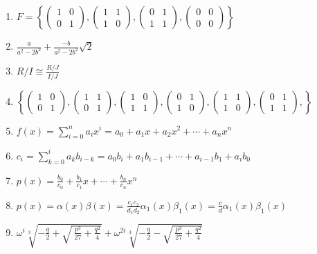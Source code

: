 \documentclass[oneside,10pt,]{article}
\begin{document}
\begin{enumerate}
\item{}\(F = \left\{ \begin{pmatrix} 1 & 0 \\ 0 & 1 \end{pmatrix}, \begin{pmatrix} 1 & 1 \\ 1 & 0 \end{pmatrix}, \begin{pmatrix} 0 & 1 \\ 1 & 1 \end{pmatrix}, \begin{pmatrix} 0 & 0 \\ 0 & 0 \end{pmatrix} \right\}\)%
\item{}\(\frac{a}{a^2 - 2 b^2} +\frac{- b}{ a^2 - 2 b^2} \sqrt{2}\)%
\item{}\(R/I \cong \frac{R/J}{I/J}\)%
\item{}\(\left\{ \begin{pmatrix} 1 & 0 \\ 0 & 1 \end{pmatrix}, \begin{pmatrix} 1 & 1 \\ 0 & 1 \end{pmatrix}, \begin{pmatrix} 1 & 0 \\ 1 & 1 \end{pmatrix}, \begin{pmatrix} 0 & 1 \\ 1 & 0 \end{pmatrix}, \begin{pmatrix} 1 & 1 \\ 1 & 0 \end{pmatrix}, \begin{pmatrix} 0 & 1 \\ 1 & 1 \end{pmatrix}, \right\}\)%
\item{}\(f(x) = \sum^{n}_{i=0} a_i x^i = a_0 + a_1 x +a_2 x^2 + \cdots + a_n x^n\)%
\item{}\(c_i = \sum_{k = 0}^i a_k b_{i - k} = a_0 b_i + a_1 b_{i -1} + \cdots + a_{i -1} b _1 + a_i b_0\)%
\item{}\(p(x) = \frac{b_0}{c_0} + \frac{b_1}{c_1} x + \cdots + \frac{b_n}{c_n} x^n\)%
\item{}\(p(x) = \alpha(x) \beta(x) = \frac{c_1 c_2}{d_1 d_2} \alpha_1(x) \beta_1(x) = \frac{c}{d} \alpha_1(x) \beta_1(x)\)%
\item{}\(\omega^i \sqrt[3]{-\frac{q}{2}+ \sqrt{\ \frac{p^3}{27} + \frac{q^2}{4}} } + \omega^{2i} \sqrt[3]{-\frac{q}{2}- \sqrt{\ \frac{p^3}{27} + \frac{q^2}{4}} }\)%

\end{enumerate}
\end{document}
